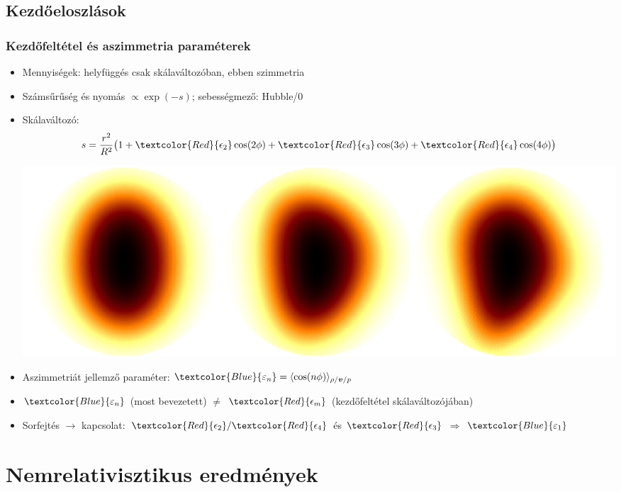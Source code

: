 \documentclass{beamer}
\begin{document}
\subsection{Kezdőeloszlások}
\begin{frame}
\frametitle{Kezdőfeltétel és aszimmetria paraméterek}
\begin{itemize}
  \setlength{\itemsep}{6pt}
\item<1-> Mennyiségek: helyfüggés csak skálaváltozóban, ebben szimmetria
\item<1-> Számsűrűség és nyomás \large{$\propto \exp{(-s)}$}; sebességmező: Hubble/0
\item<1-> Skálaváltozó: 
\begin{equation*}
s=\frac{r^2}{R^2}\big(1+\textcolor{Red}{\epsilon_2}\cos(2\phi)+\textcolor{Red}{\epsilon_3}\cos(3\phi)+\textcolor{Red}{\epsilon_4}\cos(4\phi)\big)\end{equation*}
\begin{center}
\includegraphics[scale=0.15]{pic/ic}
\end{center}
\item<1-> Aszimmetriát jellemző paraméter: $\textcolor{Blue}{\varepsilon_n}=\langle \cos(n\phi)\rangle_{\rho/\bm{v}/p}$
\item<1-> $\textcolor{Blue}{\varepsilon_n}$ (most bevezetett)  $\neq$ $\textcolor{Red}{\epsilon_m}$  (kezdőfeltétel skálaváltozójában)
\item<1-> Sorfejtés $\rightarrow$ kapcsolat: $\textcolor{Red}{\epsilon_2}/\textcolor{Red}{\epsilon_4}$ és $\textcolor{Red}{\epsilon_3}$ $\Rightarrow$ $\textcolor{Blue}{\varepsilon_1}$
\end{itemize}
\end{frame}


\section{Nemrelativisztikus eredmények}
\end{document}
